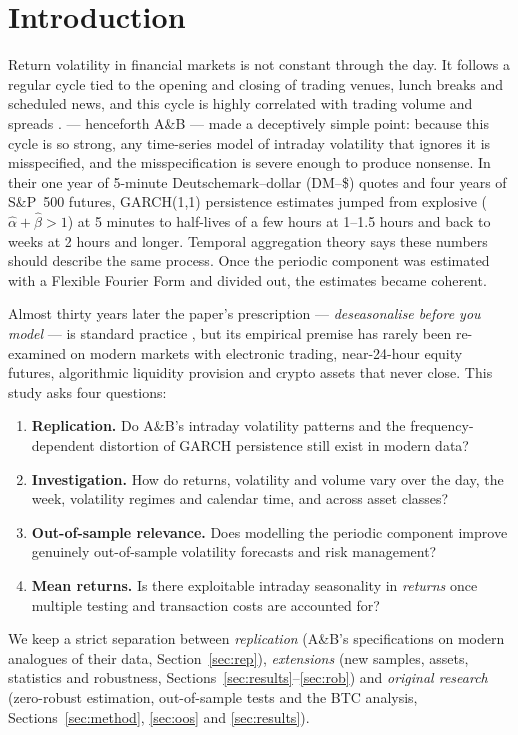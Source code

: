 \documentclass[11pt,a4paper]{article}
\begin{document}
\section{Introduction}
Return volatility in financial markets is not constant through the day. It follows a regular cycle tied to the opening and closing of trading venues, lunch breaks and scheduled news, and this cycle is highly correlated with trading volume and spreads \citep{Wood1985,Harris1986,AdmatiPfleiderer1988}. \citet{AB1997} --- henceforth A\&B --- made a deceptively simple point: because this cycle is so strong, any time-series model of intraday volatility that ignores it is misspecified, and the misspecification is severe enough to produce nonsense. In their one year of 5-minute Deutschemark--dollar (DM--\$) quotes and four years of S\&P~500 futures, GARCH(1,1) persistence estimates jumped from explosive ($\hat\alpha+\hat\beta>1$) at 5 minutes to half-lives of a few hours at 1--1.5 hours and back to weeks at 2 hours and longer. Temporal aggregation theory \citep{DrostNijman1993} says these numbers should describe the same process. Once the periodic component was estimated with a Flexible Fourier Form \citep{Gallant1981} and divided out, the estimates became coherent.

Almost thirty years later the paper's prescription --- \emph{deseasonalise before you model} --- is standard practice \citep{Engle2012,Boudt2011}, but its empirical premise has rarely been re-examined on modern markets with electronic trading, near-24-hour equity futures, algorithmic liquidity provision and crypto assets that never close. This study asks four questions:
\begin{enumerate}
\item \textbf{Replication.} Do A\&B's intraday volatility patterns and the frequency-dependent distortion of GARCH persistence still exist in modern data?
\item \textbf{Investigation.} How do returns, volatility and volume vary over the day, the week, volatility regimes and calendar time, and across asset classes?
\item \textbf{Out-of-sample relevance.} Does modelling the periodic component improve genuinely out-of-sample volatility forecasts and risk management?
\item \textbf{Mean returns.} Is there exploitable intraday seasonality in \emph{returns} once multiple testing and transaction costs are accounted for?
\end{enumerate}
We keep a strict separation between \emph{replication} (A\&B's specifications on modern analogues of their data, Section~\ref{sec:rep}), \emph{extensions} (new samples, assets, statistics and robustness, Sections~\ref{sec:results}--\ref{sec:rob}) and \emph{original research} (zero-robust estimation, out-of-sample tests and the BTC analysis, Sections~\ref{sec:method}, \ref{sec:oos} and \ref{sec:results}).
\end{document}
